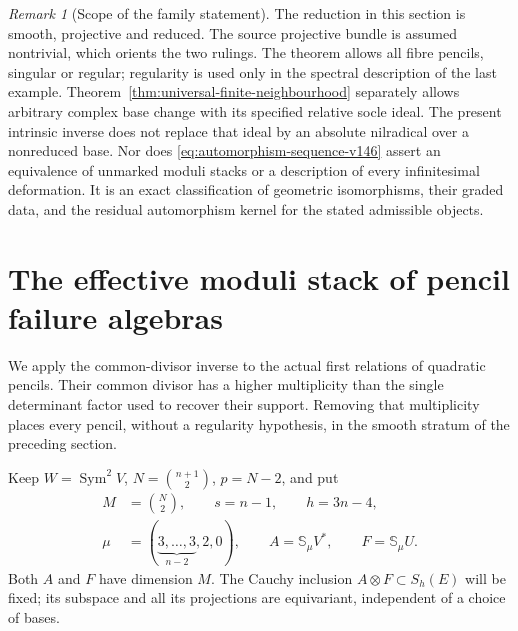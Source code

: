 \documentclass[11pt,reqno]{amsart}
\numberwithin{equation}{section}
\theoremstyle{definition}\newtheorem{definition}[theorem]{Definition}
\theoremstyle{remark}\newtheorem{remark}[theorem]{Remark}
\DeclareMathOperator{\Sym}{Sym}\DeclareMathOperator{\Gr}{Gr}
\begin{document}
\begin{remark}[Scope of the family statement]
\label{rem:moving-scope-v146}
The reduction in this section is smooth, projective and reduced.  The
source projective bundle is assumed nontrivial, which orients the two
rulings.  The theorem allows all fibre pencils, singular or regular;
regularity is used only in the spectral description of the last
example.  Theorem~\ref{thm:universal-finite-neighbourhood} separately
allows arbitrary complex base change with its specified relative
socle ideal.  The present intrinsic inverse does not replace that
ideal by an absolute nilradical over a nonreduced base.  Nor does
\eqref{eq:automorphism-sequence-v146} assert an equivalence of
unmarked moduli stacks or a description of every infinitesimal
deformation.  It is an exact classification of geometric
isomorphisms, their graded data, and the residual automorphism kernel
for the stated admissible objects.
\end{remark}

\section{The effective moduli stack of pencil failure algebras}
\label{sec:pencil-deformations}

We apply the common-divisor inverse to the actual first relations of
quadratic pencils.  Their common divisor has a higher multiplicity
than the single determinant factor used to recover their support.
Removing that multiplicity places every pencil, without a regularity
hypothesis, in the smooth stratum of the preceding section.

Keep \(W=\Sym^2V\), \(N=\binom{n+1}{2}\), \(p=N-2\), and put
\begin{equation}\label{eq:primitive-pencils}
 \begin{split}
 M&=\binom N2,\qquad s=n-1,\qquad h=3n-4,\\
 \mu&=(\underbrace{3,\ldots,3}_{n-2},2,0),\qquad
 A=\mathbb S_\mu V^*,\qquad F=\mathbb S_\mu U.
 \end{split}
\end{equation}
Both \(A\) and \(F\) have dimension \(M\).  The Cauchy inclusion
\(A\otimes F\subset S_h(E)\) will be fixed; its subspace and all
its projections are equivariant, independent of a choice of bases.
\end{document}
